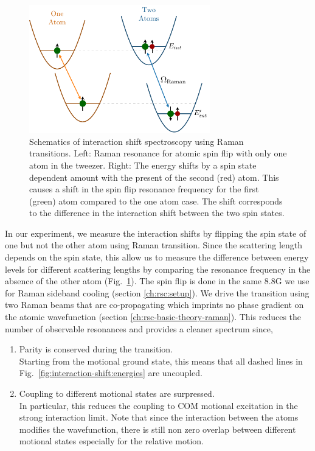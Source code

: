 \begin{figure}
  \centering
  \includegraphics[width=0.7\textwidth]{figures/interaction_shift_measure.pdf}
  \caption[Schematics of interaction shift spectroscopy.]{
    Schematics of interaction shift spectroscopy using Raman transitions.
    Left: Raman resonance for atomic spin flip with only one atom in the tweezer.
    Right: The energy shifts by a spin state dependent amount with the present of
    the second (red) atom. This causes a shift in the spin flip resonance frequency
    for the first (green) atom compared to the one atom case.
    The shift corresponds to the difference in the interaction shift between the
    two spin states.
    \label{fig:interaction-shift:measure}}
\end{figure}

In our experiment, we measure the interaction shifts by flipping the spin state of
one but not the other atom using Raman transition.
Since the scattering length depends on the spin state,
this allow us to measure the difference between energy levels for different scattering lengths
by comparing the resonance frequency in the absence of the other atom
(Fig.~\ref{fig:interaction-shift:measure}).
The spin flip is done in the same $8.8 \mathrm{G}$ we use for Raman sideband cooling
(section \ref{ch:rsc:setup}).
We drive the transition using two Raman beams that are co-propagating
which imprints no phase gradient on the atomic wavefunction
(section \ref{ch:rsc-basic-theory-raman}).
This reduces the number of observable resonances and provides a cleaner spectrum since,
\begin{enumerate}
\item Parity is conserved during the transition.\\
  Starting from the motional ground state, this means that all dashed lines in
  Fig.~\ref{fig:interaction-shift:energies} are uncoupled.
\item Coupling to different motional states are surpressed.\\
  In particular, this reduces the coupling to COM motional excitation
  in the strong interaction limit.
  Note that since the interaction between the atoms modifies the wavefunction,
  there is still non zero overlap between different motional states
  especially for the relative motion.
\end{enumerate}

